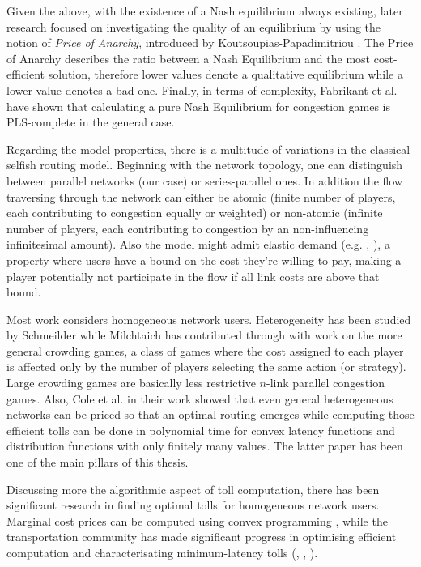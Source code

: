 \documentclass[10pt,a4paper]{book}
\theoremstyle{definition}
\theoremstyle{comment}
\begin{document}
Given the above, with the existence of a Nash equilibrium always existing, later research focused on investigating the quality of an equilibrium by using the notion of \textit{Price of Anarchy}, introduced by Koutsoupias-Papadimitriou \cite{KOUTSOUPIAS200965}.
The Price of Anarchy describes the ratio between a Nash Equilibrium and the most cost-efficient solution, therefore lower values denote a qualitative equilibrium while a lower value denotes a bad one.
Finally, in terms of complexity, Fabrikant et al. \cite{10.1145/1007352.1007445} have shown that calculating a pure Nash Equilibrium for congestion games is PLS-complete in the general case.

Regarding the model properties, there is a multitude of variations in the classical selfish routing model.
Beginning with the network topology, one can distinguish between parallel networks (our case) or series-parallel ones.
In addition the flow traversing through the network can either be atomic (finite number of players, each contributing to congestion equally or weighted) or non-atomic (infinite number of players, each contributing to congestion by an non-influencing infinitesimal amount).
Also the model might admit elastic demand (e.g. \cite{10.1287/moor.1060.0231}, \cite{Hearn1998}), a property where users have a bound on the cost they're willing to pay, making a player potentially not participate in the flow if all link costs are above that bound.

Most work considers homogeneous network users.
Heterogeneity has been studied by Schmeilder \cite{1973JSP.....7..295S} while Milchtaich \cite[Prop $3.3$]{doi:10.1287/moor.25.3.349.12220} has contributed through with work on the more general crowding games, a class of games where the cost assigned to each player is affected only by the number of players selecting the same action (or strategy).
Large crowding games are basically less restrictive $n$-link parallel congestion games.
Also, Cole et al. \cite{10.1145/780542.780618} in their work showed that even general heterogeneous networks can be priced so that an optimal routing emerges while computing those efficient tolls can be done in polynomial time for convex latency functions and distribution functions with only finitely many values.
The latter paper has been one of the main pillars of this thesis.

Discussing more the algorithmic aspect of toll computation, there has been significant research in finding optimal tolls for homogeneous network users.
Marginal cost prices can be computed using convex programming \cite{beckmann1956studies}, while the transportation community has made significant progress in optimising efficient computation and characterisating minimum-latency tolls (\cite{10.1007/978-3-642-59179-2_4}, \cite{Hearn1998}, \cite{Hearn2002}).
\end{document}
